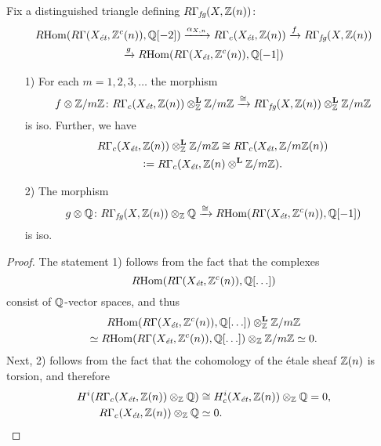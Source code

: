 \begin{observation}
  \label{RGammafg-with-Q-and-Z/nZ-coeffs}
  Fix a distinguished triangle defining $R\Gamma_\text{\it fg} (X, \mathbb{Z} (n))$:
  \begin{multline*}
    R\!\operatorname{Hom} (R\Gamma (X_\text{\it ét}, \mathbb{Z}^c (n)), \mathbb{Q} [-2])
    \xrightarrow{\alpha_{X,n}} R\Gamma_c (X_\text{\it ét}, \mathbb{Z} (n))
    \xrightarrow{f} R\Gamma_\text{\it fg} (X, \mathbb{Z} (n)) \\
    \xrightarrow{g} R\!\operatorname{Hom} (R\Gamma (X_\text{\it ét}, \mathbb{Z}^c (n)), \mathbb{Q} [-1])
  \end{multline*}

  \begin{enumerate}
  \item[1)] For each $m = 1,2,3,\ldots$ the morphism
    \[ f \otimes \mathbb{Z}/m\mathbb{Z} \colon
      R\Gamma_c (X_\text{\it ét}, \mathbb{Z} (n)) \otimes_{\mathbb{Z}}^\mathbf{L} \mathbb{Z}/m\mathbb{Z}
      \xrightarrow{\cong}
      R\Gamma_\text{\it fg} (X, \mathbb{Z} (n)) \otimes_{\mathbb{Z}}^\mathbf{L} \mathbb{Z}/m\mathbb{Z} \]
    is iso. Further, we have
    \begin{multline*}
      R\Gamma_c (X_\text{\it ét}, \mathbb{Z} (n)) \otimes_{\mathbb{Z}}^\mathbf{L} \mathbb{Z}/m\mathbb{Z} \cong
      R\Gamma_c (X_\text{\it ét}, \mathbb{Z}/m\mathbb{Z} (n)) \\
      \mathrel{\mathop:}= R\Gamma_c (X_\text{\it ét}, \mathbb{Z} (n) \otimes^\mathbf{L} \mathbb{Z}/m\mathbb{Z}).
    \end{multline*}

  \item[2)] The morphism
    \[ g\otimes\mathbb{Q} \colon
      R\Gamma_\text{\it fg} (X, \mathbb{Z} (n)) \otimes_{\mathbb{Z}} \mathbb{Q} \xrightarrow{\cong}
      R\!\operatorname{Hom} (R\Gamma (X_\text{\it ét}, \mathbb{Z}^c (n)), \mathbb{Q} [-1]) \]
    is iso.
  \end{enumerate}

  \begin{proof}
    The statement 1) follows from the fact that the complexes
    $$R\!\operatorname{Hom} (R\Gamma (X_\text{\it ét}, \mathbb{Z}^c (n)), \mathbb{Q} [\ldots])$$
    consist of $\mathbb{Q}$-vector spaces, and thus
    \begin{multline*}
      R\!\operatorname{Hom} (R\Gamma (X_\text{\it ét}, \mathbb{Z}^c (n)), \mathbb{Q} [\ldots]) \otimes_{\mathbb{Z}}^\mathbf{L} \mathbb{Z}/m\mathbb{Z} \\
      \simeq R\!\operatorname{Hom} (R\Gamma (X_\text{\it ét}, \mathbb{Z}^c (n)), \mathbb{Q} [\ldots]) \otimes_{\mathbb{Z}} \mathbb{Z}/m\mathbb{Z} \simeq 0.
    \end{multline*}
    Next, 2) follows from the fact that the cohomology of the étale sheaf
    $\mathbb{Z} (n)$ is torsion, and therefore
    \begin{align*}
      H^i (R\Gamma_c (X_\text{\it ét}, \mathbb{Z} (n)) \otimes_{\mathbb{Z}} \mathbb{Q}) & \cong H^i_c (X_\text{\it ét}, \mathbb{Z} (n)) \otimes_{\mathbb{Z}} \mathbb{Q} = 0,\\
      R\Gamma_c (X_\text{\it ét}, \mathbb{Z} (n)) \otimes_{\mathbb{Z}} \mathbb{Q} & \simeq 0.
    \end{align*}

  \end{proof}
\end{observation}



